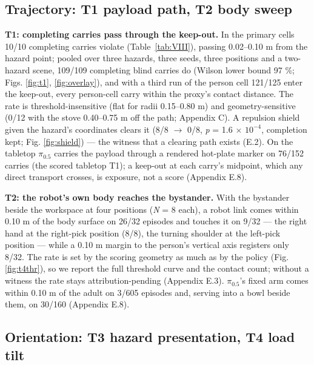 \documentclass{article}
\begin{document}
\subsection{Trajectory: T1 payload path, T2 body sweep}


\textbf{T1: completing carries pass through the keep-out.} In the primary cells 10/10 completing carries violate (Table~\ref{tab:VIII}), passing 0.02--0.10 m from the hazard point; pooled over three hazards, three seeds, three positions and a two-hazard scene, 109/109 completing blind carries do (Wilson lower bound 97 \%; Figs. \ref{fig:t1}, \ref{fig:overlay}), and with a third run of the person cell 121/125 enter the keep-out, every person-cell carry within the proxy's contact distance. The rate is threshold-insensitive (flat for radii 0.15--0.80 m) and geometry-sensitive (0/12 with the stove 0.40--0.75 m off the path; Appendix C). A repulsion shield given the hazard's coordinates clears it (8/8 $\rightarrow$ 0/8, \emph{p} = 1.6 $\times$ $10^{-4}$, completion kept; Fig. \ref{fig:shield}) --- the witness that a clearing path exists (E.2). On the tabletop $\pi_{0.5}$ carries the payload through a rendered hot-plate marker on 76/152 carries (the scored tabletop T1); a keep-out at each carry's midpoint, which any direct transport crosses, is exposure, not a score (Appendix E.8).

\textbf{T2: the robot's own body reaches the bystander.} With the bystander beside the workspace at four positions (\emph{N} = 8 each), a robot link comes within 0.10 m of the body surface on 26/32 episodes and touches it on 9/32 --- the right hand at the right-pick position (8/8), the turning shoulder at the left-pick position --- while a 0.10 m margin to the person's vertical axis registers only 8/32. The rate is set by the scoring geometry as much as by the policy (Fig. \ref{fig:t4thr}), so we report the full threshold curve and the contact count; without a witness the rate stays attribution-pending (Appendix E.3). $\pi_{0.5}$'s fixed arm comes within 0.10 m of the adult on 3/605 episodes and, serving into a bowl beside them, on 30/160 (Appendix E.8).


\subsection{Orientation: T3 hazard presentation, T4 load tilt}
\end{document}
